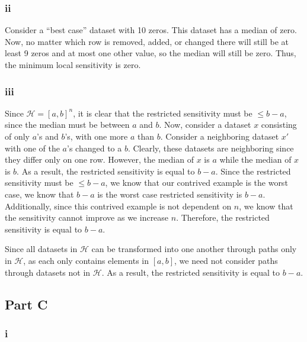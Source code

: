 \documentclass[12pt]{article}
\begin{document}
\subsubsection{ii}

\noindent

Consider a ``best case'' dataset with 10 zeros. This dataset has a median of zero. Now, no matter which row is removed, added, or changed there will still be at least 9 zeros and at most one other value, so the median will still be zero. Thus, the minimum local sensitivity is zero.

\subsubsection{iii}

\noindent

Since $\mathcal{H} = [a, b]^n$, it is clear that the restricted sensitivity must be $\leq b-a$, since the median must be between $a$ and $b$. Now, consider a dataset $x$ consisting of only $a$'s and $b$'s, with one more $a$ than $b$. Consider a neighboring dataset $x'$ with one of the $a$'s changed to a $b$. Clearly, these datasets are neighboring since they differ only on one row. However, the median of $x$ is $a$ while the median of $x$ is $b$. As a result, the restricted sensitivity is equal to $b - a$. Since the restricted sensitivity must be $\leq b-a$, we know that our contrived example is the worst case, we know that $b-a$ is the worst case restricted sensitivity is $b-a$. Additionally, since this contrived example is not dependent on $n$, we know that the sensitivity cannot improve as we increase $n$. Therefore, the restricted sensitivity is equal to $b-a$.

\bigskip

Since all datasets in $\mathcal{H}$ can be transformed into one another through paths only in $\mathcal{H}$, as each only contains elements in $[a, b]$, we need not consider paths through datasets not in $\mathcal{H}$. As a result, the restricted sensitivity is equal to $b-a$.

\subsection{Part C}

\subsubsection{i}

\noindent
\end{document}
